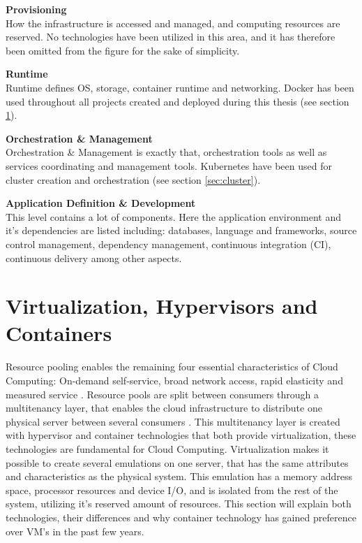 \textbf{Provisioning}\\ 
How the infrastructure is accessed and managed, and computing resources are reserved. No technologies have been utilized in this area, and it has therefore been omitted from the figure for the sake of simplicity.
 
\textbf{Runtime}\\
Runtime defines OS, storage, container runtime and networking. Docker has been used throughout all projects created and deployed during this thesis (see section \ref{sec:virtualization}).
 
\textbf{Orchestration \& Management}\\
Orchestration \& Management is exactly that, orchestration tools as well as services coordinating and management tools. Kubernetes have been used for cluster creation and orchestration (see section \ref{sec:cluster}).
 
\textbf{Application Definition \& Development}\\
This level contains a lot of components. Here the application environment and it's dependencies are listed including: databases, language and frameworks, source control management, dependency management, continuous integration (CI), continuous delivery among other aspects.

\section{Virtualization, Hypervisors and Containers}
\label{sec:virtualization}
Resource pooling enables the remaining four essential characteristics of Cloud Computing: On-demand self-service, broad network access, rapid elasticity and measured service \cite{bittman2009server}. Resource pools are split  between consumers through a multitenancy layer, that enables the cloud infrastructure to distribute one physical server between several consumers \cite{krebs2012architectural}. This multitenancy layer is created with hypervisor and container technologies that both provide virtualization, these technologies are fundamental for Cloud Computing. Virtualization makes it possible to create several emulations on one server, that has the same attributes and characteristics as the physical system. This emulation has a memory address space, processor resources and device I/O, and is isolated from the rest of the system, utilizing it's reserved amount of resources. This section will explain both technologies, their differences and why container technology has gained preference over VM's in the past few years.

